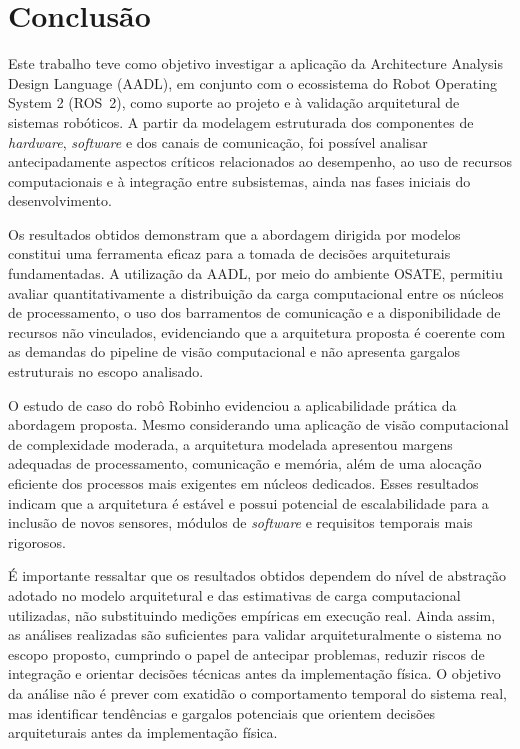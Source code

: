 \chapter{Conclusão}

Este trabalho teve como objetivo investigar a aplicação da Architecture Analysis Design Language (AADL), em conjunto com o ecossistema do Robot Operating System 2 (ROS~2), como suporte ao projeto e à validação arquitetural de sistemas robóticos. A partir da modelagem estruturada dos componentes de \textit{hardware}, \textit{software} e dos canais de comunicação, foi possível analisar antecipadamente aspectos críticos relacionados ao desempenho, ao uso de recursos computacionais e à integração entre subsistemas, ainda nas fases iniciais do desenvolvimento.

Os resultados obtidos demonstram que a abordagem dirigida por modelos constitui uma ferramenta eficaz para a tomada de decisões arquiteturais fundamentadas. A utilização da AADL, por meio do ambiente OSATE, permitiu avaliar quantitativamente a distribuição da carga computacional entre os núcleos de processamento, o uso dos barramentos de comunicação e a disponibilidade de recursos não vinculados, evidenciando que a arquitetura proposta é coerente com as demandas do pipeline de visão computacional e não apresenta gargalos estruturais no escopo analisado.

O estudo de caso do robô Robinho evidenciou a aplicabilidade prática da abordagem proposta. Mesmo considerando uma aplicação de visão computacional de complexidade moderada, a arquitetura modelada apresentou margens adequadas de processamento, comunicação e memória, além de uma alocação eficiente dos processos mais exigentes em núcleos dedicados. Esses resultados indicam que a arquitetura é estável e possui potencial de escalabilidade para a inclusão de novos sensores, módulos de \textit{software} e requisitos temporais mais rigorosos. 

É importante ressaltar que os resultados obtidos dependem do nível de abstração adotado no modelo arquitetural e das estimativas de carga computacional utilizadas, não substituindo medições empíricas em execução real. Ainda assim, as análises realizadas são suficientes para validar arquiteturalmente o sistema no escopo proposto, cumprindo o papel de antecipar problemas, reduzir riscos de integração e orientar decisões técnicas antes da implementação física. O objetivo da análise não é prever com exatidão o comportamento temporal do sistema real, mas identificar tendências e gargalos potenciais que orientem decisões arquiteturais antes da implementação física.

